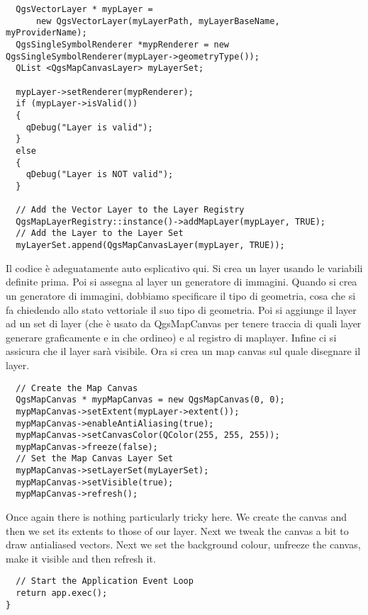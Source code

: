 \begin{verbatim}
  QgsVectorLayer * mypLayer =
      new QgsVectorLayer(myLayerPath, myLayerBaseName, myProviderName);
  QgsSingleSymbolRenderer *mypRenderer = new
QgsSingleSymbolRenderer(mypLayer->geometryType());
  QList <QgsMapCanvasLayer> myLayerSet;

  mypLayer->setRenderer(mypRenderer);
  if (mypLayer->isValid())
  {
    qDebug("Layer is valid");
  }
  else
  {
    qDebug("Layer is NOT valid");
  }

  // Add the Vector Layer to the Layer Registry
  QgsMapLayerRegistry::instance()->addMapLayer(mypLayer, TRUE);
  // Add the Layer to the Layer Set
  myLayerSet.append(QgsMapCanvasLayer(mypLayer, TRUE));

\end{verbatim}

Il codice è adeguatamente auto esplicativo qui. Si crea un layer usando le variabili definite prima. Poi si assegna al layer un generatore di immagini. Quando si crea un generatore di immagini, dobbiamo specificare il tipo di geometria, cosa che si fa chiedendo allo stato vettoriale il suo tipo di geometria. Poi si aggiunge il layer ad un set di layer (che è usato da QgsMapCanvas per tenere traccia di quali layer generare graficamente e in che ordineo) e al registro di maplayer. Infine ci si assicura che il layer sarà visibile.
Ora si crea un map canvas sul quale disegnare il layer.

\begin{verbatim}
  // Create the Map Canvas
  QgsMapCanvas * mypMapCanvas = new QgsMapCanvas(0, 0);
  mypMapCanvas->setExtent(mypLayer->extent());
  mypMapCanvas->enableAntiAliasing(true);
  mypMapCanvas->setCanvasColor(QColor(255, 255, 255));
  mypMapCanvas->freeze(false);
  // Set the Map Canvas Layer Set
  mypMapCanvas->setLayerSet(myLayerSet);
  mypMapCanvas->setVisible(true);
  mypMapCanvas->refresh();

\end{verbatim}

Once again there is nothing particularly tricky here. We create the canvas
and then we set its extents to those of our layer. Next we tweak the canvas a bit
to draw antialiased vectors. Next we set the background colour, unfreeze the
canvas, make it visible and then refresh it.

\begin{verbatim}
  // Start the Application Event Loop
  return app.exec();
}

\end{verbatim}


